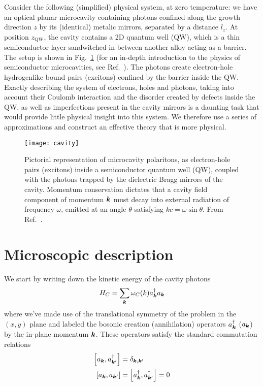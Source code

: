 Consider the following (simplified) physical system, at zero
temperature: we have an optical planar microcavity containing photons
confined along the growth direction $z$ by its (identical) metalic
mirrors, separated by a distance $l_z$. At position $z_{\text{QW}}$,
the cavity contains a 2D quantum well (QW), which is a thin
semiconductor layer sandwitched in between another alloy acting as a
barrier. The setup is shown in Fig.~\ref{fig:cavity-polaritons} (for
an in-depth introduction to the physics of semiconductor
microcavities, see Ref.~\cite{9780199228942}). The photons create
electron-hole hydrogenlike bound pairs (excitons) confined by the
barrier inside the QW. Exactly describing the system of electrons,
holes and photons, taking into account their Coulomb interaction and
the disorder created by defects inside the QW, as well as
imperfections present in the cavity mirrors is a daunting task that
would provide little physical insight into this system. We therefore
use a series of approximations and construct an effective theory that
is more physical.
%
\begin{figure}[tb]\centering
  \texttt{[image: cavity]}
  \caption{
    Pictorial representation of microcavity polaritons, as electron-hole pairs (excitons) inside a semiconductor quantum well (QW), 
    coupled with the photons trapped by the dielectric Bragg mirrors of the cavity. 
    Momentum conservation dictates that a cavity field component of momentum $\bm{k}$ must decay into external radiation of frequency $\omega$, emitted at an angle $\theta$ satisfying $k c = \omega \sin\theta$.
    From Ref.~\cite{Kasprzak_2006}.
  }\label{fig:cavity-polaritons}
\end{figure}

\section{Microscopic description}
\label{sec:microscopic}


We start by writing down the kinetic energy of the cavity photons
%
\begin{equation}\label{eq:cavity-energy}
  H_{C} = \sum_{\bm{k}} \omega_C(k) a_{\bm{k}}^{\dagger} a_{\bm{k}}
\end{equation}
% 
where we've made use of the translational symmetry of the problem in
the $(x,y)$ plane and labeled the bosonic creation (annihilation)
operators $a_{\bm{k}}^{\dagger}$ ($a_{\bm{k}}$) by the in-plane momentum
$\bm{k}$. These operators satisfy the standard commutation relations
\begin{align}
  \left[a_{\bm{k}}, a_{\bm{k}^{\prime}}^{\dagger}\right] & =\delta_{\bm{k},\bm{k}^{\prime}}\\
  \left[a_{\bm{k}}, a_{\bm{k}^{\prime}}\right] & =\left[a_{\bm{k}}^{\dagger}, a_{\bm{k}^{\prime}}^{\dagger}\right] = 0
\end{align}

